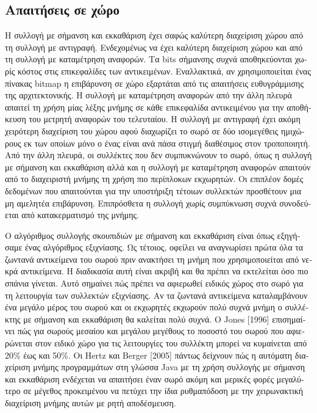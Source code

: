 \begin{greek}
\subsection{Απαιτήσεις σε χώρο}
Η συλλογή με σήμανση και εκκαθάριση έχει σαφώς καλύτερη διαχείριση
χώρου από τη συλλογή με αντιγραφή. Ενδεχομένως να έχει καλύτερη
διαχείριση χώρου και από τη συλλογή με καταμέτρηση αναφορών. Τα
bits σήμανσης συχνά αποθηκεύονται χωρίς κόστος στις επικεφαλίδες
των αντικειμένων. Εναλλακτικά, αν χρησιμοποιείται ένας πίνακας
bitmap η επιβάρυνση σε χώρο εξαρτάται από τις απαιτήσεις ευθυγράμμισης
της αρχιτεκτονικής. Η συλλογή με καταμέτρηση αναφορών από την
άλλη πλευρά απαιτεί τη χρήση μίας λέξης μνήμης σε κάθε επικεφαλίδα
αντικειμένου για την αποθήκευση του μετρητή αναφορών του τελευταίου.
Η συλλογή με αντιγραφή έχει ακόμη χειρότερη διαχείριση του χώρου
αφού διαχωρίζει το σωρό σε δύο ισομεγέθεις ημιχώρους εκ των οποίων
μόνο ο ένας είναι ανά πάσα στιγμή διαθέσιμος στον τροποποιητή.
Από την άλλη πλευρά, οι συλλέκτες που δεν συμπυκνώνουν το σωρό,
όπως η συλλογή με σήμανση και εκκαθάριση αλλά και η συλλογή με
καταμέτρηση αναφορών απαιτούν από το διαχειριστή μνήμης τη χρήση
πιο περίπλοκων εκχωρητών. Οι επιπλέον δομές δεδομένων που απαιτούνται
για την υποστήριξη τέτοιων συλλεκτών προσθέτουν μια μη αμελητέα
επιβάρυνση. Επιπρόσθετα η συλλογή χωρίς συμπύκνωση συχνά συνοδεύεται
από κατακερματισμό της μνήμης.

Ο αλγόριθμος συλλογής σκουπιδιών με σήμανση και εκκαθάριση είναι
όπως εξηγήσαμε ένας αλγόριθμος εξιχνίασης. Ως τέτοιος, οφείλει 
να αναγνωρίσει πρώτα όλα τα ζωντανά αντικείμενα του σωρού πριν
ανακτήσει τη μνήμη που χρησιμοποιείται από νεκρά αντικείμενα. 
Η διαδικασία αυτή είναι ακριβή και θα πρέπει να εκτελείται όσο 
πιο σπάνια γίνεται. Αυτό σημαίνει πώς πρέπει να αφιερωθεί ειδικός 
χώρος στο σωρό για τη λειτουργία των συλλεκτών εξιχνίασης. Αν 
τα ζωντανά αντικείμενα καταλαμβάνουν ένα μεγάλο μέρος του σωρού 
και οι εκχωρητές εκχωρούν πολύ συχνά μνήμη ο συλλέκτης με σήμανση 
και εκκαθάριση θα καλείται πολύ συχνά. O Jones [1996] επισημαίνει 
πώς για σωρούς μεσαίου και μεγάλου μεγέθους το ποσοστό του σωρού 
που αφιερώνεται στον ειδικό χώρο για τις λειτουργίες του συλλέκτη 
μπορεί να κυμαίνεται από 20\% έως και 50\%. Οι Hertz και Berger
[2005] \cite{DBLP:conf/oopsla/HertzB05} πάντως δείχνουν πώς
η αυτόματη διαχείριση μνήμης προγραμμάτων στη γλώσσα Java με
τη χρήση συλλογής με σήμανση και εκκαθάριση ενδέχεται να απαιτήσει
έναν σωρό ακόμη και μερικές φορές μεγαλύτερο σε μέγεθος προκειμένου
να πετύχει την ίδια ρυθμαπόδοση με την χειρωνακτική διαχείριση
μνήμης αυτών με ρητή αποδέσμευση.


\end{greek}
